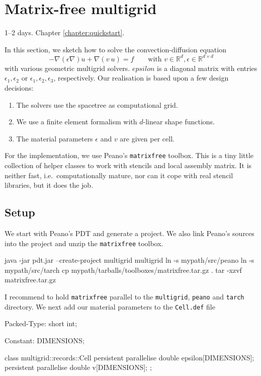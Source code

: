 \section{Matrix-free multigrid}
  \label{section:applications:matrix-free-multigrid}

\chapterDescription
  {
    1--2 days.
  }
  {
    Chapter \ref{chapter:quickstart}.
  }

In this section, we sketch how to solve the convection-diffusion equation
\[
  - \nabla (\epsilon \nabla) u + \nabla (v\ u) = f \qquad \mbox{with } v \in
  \mathbb{R}^d, \epsilon \in \mathbb{R}^{d \times d}
\]
with various geometric multigrid solvers. $epsilon$ is a diagonal matrix with
entries $\epsilon _1, \epsilon _2$ or $\epsilon _1, \epsilon _2, \epsilon _3$,
respectively.
Our realisation is based upon a few design decisions:

\begin{enumerate}
  \item The solvers use the spacetree as computational grid.
  \item We use a finite element formalism with $d$-linear shape functions.
  \item The material parameters $\epsilon $ and $v$ are given per cell.
\end{enumerate}


\noindent
For the implementation, we use Peano's \texttt{matrixfree} toolbox. 
This is a tiny little collection of helper classes to work with stencils and
local assembly matrix. 
It is neither fast, i.e.~computationally mature, nor can it cope with real
stencil libraries, but it does the job.



\subsection{Setup}

We start with Peano's PDT and generate a project. We also link Peano's sources
into the project and unzip the \texttt{matrixfree} toolbox. 
\begin{code}
  java -jar pdt.jar --create-project multigrid multigrid
  ln -s mypath/src/peano 
  ln -s mypath/src/tarch
  cp mypath/tarballs/toolboxes/matrixfree.tar.gz .
  tar -xzvf matrixfree.tar.gz
\end{code}


\noindent
I recommend to hold \texttt{matrixfree} parallel to the \texttt{multigrid},
\texttt{peano} and \texttt{tarch} directory.
We next add our material parameters to the \texttt{Cell.def} file
\begin{code}
Packed-Type: short int;

Constant: DIMENSIONS;

class multigrid::records::Cell {  
  persistent parallelise double   epsilon[DIMENSIONS];
  persistent parallelise double   v[DIMENSIONS];
};
\end{code}


